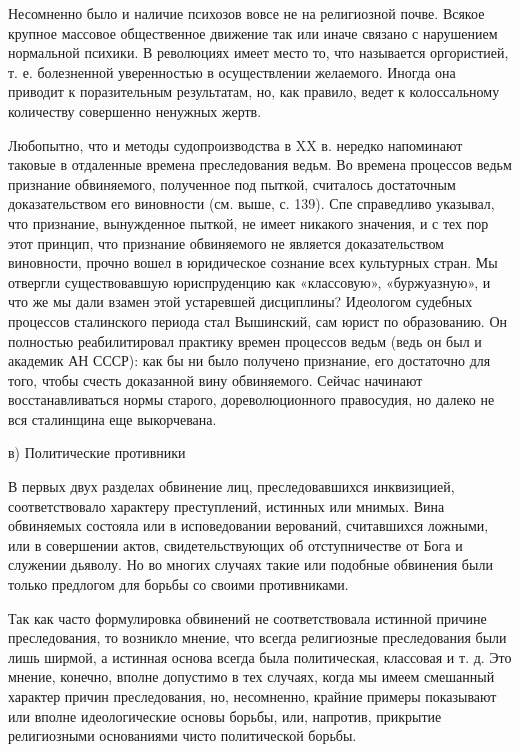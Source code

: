Несомненно  было и  наличие психозов  вовсе не  на религиозной  почве.
Всякое крупное массовое общественное движение  так или иначе связано с
нарушением  нормальной  психики.  В  революциях имеет  место  то,  что
называется оргористией, т. е. болезненной уверенностью в осуществлении
желаемого. Иногда  она приводит  к поразительным результатам,  но, как
правило, ведет к колоссальному количеству совершенно ненужных жертв.

Любопытно, что  и методы судопроизводства  в XX в.  нередко напоминают
таковые в отдаленные времена преследования ведьм. Во времена процессов
ведьм   признание  обвиняемого,   полученное  под   пыткой,  считалось
достаточным  доказательством  его  виновности   (см.  выше,  с.  139).
Спе  справедливо  указывал,  что  признание,  вынужденное  пыткой,  не
имеет  никакого значения,  и с  тех  пор этот  принцип, что  признание
обвиняемого  не является  доказательством виновности,  прочно вошел  в
юридическое сознание всех культурных стран. Мы отвергли существовавшую
юриспруденцию как «классовую»,  «буржуазную», и что же  мы дали взамен
этой устаревшей  дисциплины? Идеологом судебных  процессов сталинского
периода  стал  Вышинский,  сам  юрист  по  образованию.  Он  полностью
реабилитировал практику времен процессов ведьм (ведь он был и академик
АН  СССР): как  бы  ни  было получено  признание,  его достаточно  для
того,  чтобы  счесть  доказанной  вину  обвиняемого.  Сейчас  начинают
восстанавливаться  нормы  старого,   дореволюционного  правосудия,  но
далеко не вся сталинщина еще выкорчевана.

в) Политические противники

В первых  двух разделах  обвинение лиц,  преследовавшихся инквизицией,
соответствовало  характеру  преступлений,  истинных или  мнимых.  Вина
обвиняемых  состояла   или  в  исповедовании   верований,  считавшихся
ложными, или  в совершении актов, свидетельствующих  об отступничестве
от Бога  и служении дьяволу. Но  во многих случаях такие  или подобные
обвинения были только предлогом для борьбы со своими противниками.

Так  как  часто  формулировка обвинений  не  соответствовала  истинной
причине  преследования, то  возникло  мнение,  что всегда  религиозные
преследования  были  лишь  ширмой,   а  истинная  основа  всегда  была
политическая, классовая и т. д.  Это мнение, конечно, вполне допустимо
в тех случаях, когда мы имеем смешанный характер причин преследования,
но, несомненно,  крайние примеры показывают или  вполне идеологические
основы борьбы, или, напротив, прикрытие религиозными основаниями чисто
политической борьбы.


